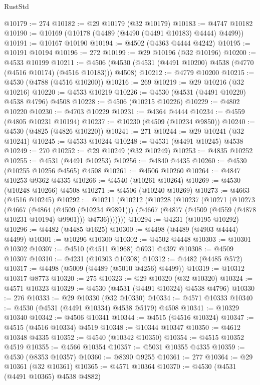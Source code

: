 \begin{lexlean}{RustStd}
\begin{coremodule}
@10179 := 274
@10182 := @29 @10179 (@32 @10179)
@10183 := @4747 @10182
@10190 := @10169 (@10178 (@4489 (@4490 (@4491 @10183) @4444) @4499))
@10191 := @10167 @10190
@10194 := @4502 (@4363 @4444 @4242)
@10195 := @10191 @10194
@10196 := 272
@10199 := @29 @10196 (@32 @10196)
@10200 := @4533 @10199
@10211 := @4506 (@4530 (@4531 (@4491 @10200) @4538 (@4770 (@4516 @10174) (@4516 @10183))) @4508)
@10212 := @4779 @10200
@10215 := @4530 (@4788 (@4516 @10200))
@10216 := 269
@10219 := @29 @10216 (@32 @10216)
@10220 := @4533 @10219
@10226 := @4530 (@4531 (@4491 @10220) @4538 @4796) @4508
@10228 := @4506 (@10215 @10226)
@10229 := @4802 @10220
@10230 := @4703 @10229
@10231 := @4364 @4444
@10234 := @4559 (@4805 @10231 @10194)
@10237 := @10230 (@4509 (@10234 @9850))
@10240 := @4530 (@4825 (@4826 @10220))
@10241 := 271
@10244 := @29 @10241 (@32 @10241)
@10245 := @4533 @10244
@10248 := @4531 (@4491 @10245) @4538
@10249 := 270
@10252 := @29 @10249 (@32 @10249)
@10253 := @4835 @10252
@10255 := @4531 (@4491 @10253)
@10256 := @4840 @4435
@10260 := @4530 (@10255 @10256 @4565) @4508
@10261 := @4506 @10260
@10264 := @4847 @10253 @9362 @4335
@10266 := @4540 (@10261 @10264)
@10269 := @4530 (@10248 @10266) @4508
@10271 := @4506 (@10240 @10269)
@10273 := @4663 (@4516 @10245)
@10292 := @10211
    (@10212
      (@10228
        (@10237
          (@10271
            (@10273
              (@4667
                (@4864 (@4509 (@10234 @9891)))
                (@4667 (@4877 (@4509 (@4559 (@4878 @10231 @10194) @9901))) @4736)))))))
@10294 := @4231 (@10195 @10292)
@10296 := @4482 (@4485 @1625)
@10300 := @4498 (@4489 (@4903 @4444) @4499)
@10301 := @10296 @10300
@10302 := @4502 @4448
@10303 := @10301 @10302
@10307 := @4510 (@4511 @1968) @6931 @4397
@10308 := @4509 @10307
@10310 := @4231 (@10303 @10308)
@10312 := @4482 (@4485 @572)
@10317 := @4498 (@5009 (@4489 (@5010 @4256) @4499))
@10319 := @10312 @10317 @8773
@10320 := 275
@10323 := @29 @10320 (@32 @10320)
@10324 := @4571 @10323
@10329 := @4530 (@4531 (@4491 @10324) @4538 @4796)
@10330 := 276
@10333 := @29 @10330 (@32 @10330)
@10334 := @4571 @10333
@10340 := @4530 (@4531 (@4491 @10334) @4538 @5179) @4508
@10341 := @10329 @10340
@10342 := @4506 @10341
@10344 := @4515 (@4516 @10324)
@10347 := @4515 (@4516 @10334) @4519
@10348 := @10344 @10347
@10350 := @4612 @10348 @4335
@10352 := @4540 (@10342 @10350)
@10354 := @4515 @10352 @4519
@10355 := @4566 @10354
@10357 := @5031 @10355 @4335
@10359 := @4530 (@8353 @10357)
@10360 := @8390 @9255
@10361 := 277
@10364 := @29 @10361 (@32 @10361)
@10365 := @4571 @10364
@10370 := @4530 (@4531 (@4491 @10365) @4538 @4882)

\end{coremodule}
\end{lexlean}
